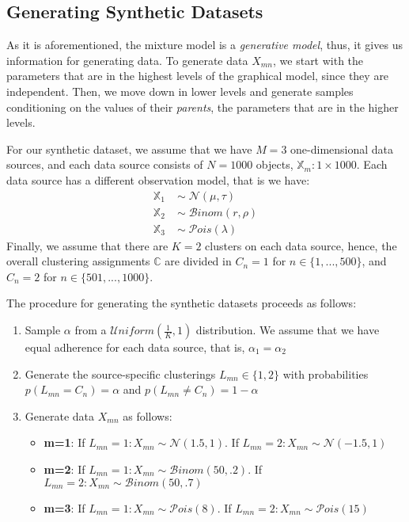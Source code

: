 \subsection{Generating Synthetic Datasets} \label{integr-synth-data-sect}
As it is aforementioned, the mixture model is a \emph{generative model}, thus, it gives us information for generating data. To generate data $X_{mn}$, we start with the parameters that are in the highest levels of the graphical model, since they are independent. Then, we move down in lower levels and generate samples conditioning on the values of their \emph{parents}, \ie the parameters that are in the higher levels. 

For our synthetic dataset, we assume that we have $M=3$ one-dimensional data sources, and each data source consists of $N=1000$ objects, \ie $\mathbb{X}_{m} : 1 \times 1000$. Each data source has a different observation model, that is we have:
\begin{equation*}
  \begin{aligned}
  	\mathbb{X}_{1} \; & \sim \; \mathcal{N}(\mu, \tau) \\
  	\mathbb{X}_{2} \; & \sim \; \mathcal{B}inom(r, \rho) \\
  	\mathbb{X}_{3} \; & \sim \; \mathcal{P}ois(\lambda)
  \end{aligned}
\end{equation*}
Finally, we assume that there are $K=2$ clusters on each data source, hence, the overall clustering assignments $\mathbb{C}$ are divided in $C_{n}=1$ for $n \in \lbrace 1,...,500 \rbrace$, and $C_{n}=2$ for $n \in \lbrace 501,...,1000 \rbrace$. 

The procedure for generating the synthetic datasets proceeds as follows:
\begin{enumerate}
	\item{
		Sample $\alpha$ from a $\mathcal{U}niform(\frac{1}{K}, 1)$ distribution. We assume that we have equal adherence for each data source, that is, $\alpha_{1} = \alpha_{2}$
	}
	\item{
		Generate the source-specific clusterings $L_{mn} \in \lbrace 1,2 \rbrace$ with probabilities $p(L_{mn} = C_{n}) = \alpha$ and $p(L_{mn} \neq C_{n}) = 1 - \alpha$
	}
	\item{
		Generate data $X_{mn}$ as follows:
		\begin{itemize}
			\item{
				\textbf{m=1}: If $L_{mn}=1 : X_{mn} \sim \mathcal{N}(1.5, 1)$. If $L_{mn}=2 : X_{mn} \sim \mathcal{N}(-1.5, 1)$
			}
			\item{ 
				\textbf{m=2}: If $L_{mn}=1 : X_{mn} \sim \mathcal{B}inom(50, .2)$. If $L_{mn}=2 : X_{mn} \sim \mathcal{B}inom(50, .7)$
			}
			\item{ 
				\textbf{m=3}: If $L_{mn}=1 : X_{mn} \sim \mathcal{P}ois(8)$. If $L_{mn}=2 : X_{mn} \sim \mathcal{P}ois(15)$
			}
		\end{itemize}	
	}
\end{enumerate}

